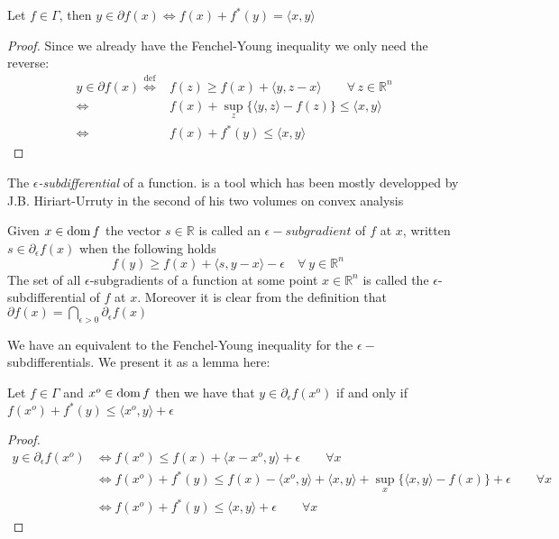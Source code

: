\begin{lemma}\label{fenchelDualLemma}
	Let $f\in \Gamma$, then $y\in \partial f(x) \iff 
	f(x) + f^*(y) = \langle x,y \rangle $
\end{lemma}
\begin{proof}
Since we already have the Fenchel-Young inequality we only need the reverse:
\begin{align*}
	y \in \partial f(x) \overset{\mathrm{def}}{\iff}&
	f(z)\geq f(x) +\langle y,z-x\rangle 
	\qquad \forall \, z\in\mathbb R^n\\
	\iff& f(x) + \sup_z\{\langle
	y,z\rangle -f(z)\}
	\leq \langle x,y \rangle \\
	\iff& f(x)+ f^*(y) \leq \langle x,y\rangle
\end{align*}
\end{proof}
\newpage
The  \emph{$\epsilon$-subdifferential} of a function.  is a tool which has been
mostly developped by J.B. Hiriart-Urruty in the second of his two volumes on
convex analysis \autocite[92]{hiriart1993convex} 
\begin{definition} 
	Given $x\in\mathrm{dom} \, f$ the vector $s\in \mathbb R$ is called
	an $\epsilon-subgradient$ of $f$ at $x$, written $s\in
	\partial_\epsilon f(x)$ when the following holds
	\begin{equation*}
		f(y) \geq f(x) + \langle s,y-x\rangle -\epsilon 
		\quad \forall \ y \in \mathbb R^n \quad
	\end{equation*}
The set of all $\epsilon$-subgradients of a function at some point
$x\in\mathbb R^n$ is called the $\epsilon$-subdifferential of $f$ at $x$.
Moreover it is clear from the definition that
$\partial f(x) = \bigcap_{\epsilon>0}\partial_{\epsilon}f(x)$
\end{definition}

We have an equivalent to the Fenchel-Young inequality for the $\epsilon-$
subdifferentials. We present it as a lemma here:
\begin{lemma}
	Let $f\in\Gamma$ and $x^o \in\mathrm{dom} \, f$ then we have that
	$y \in\partial_\epsilon f(x^o)$ if and only if 
	$f(x^o)+f^*(y) \leq \langle x^o,y\rangle + \epsilon$ 
	\label{FYepsilon}
\end{lemma}
\begin{proof}
	\begin{align*}
		y\in\partial_\epsilon f(x^o) &\iff 
		f(x^o) \leq f(x) + \langle x-x^o,y\rangle + \epsilon
		\qquad \forall x\\
	       &\iff	f(x^o) + f^*(y) \leq f(x) -\langle x^o,y\rangle 
		+ \langle x,y\rangle + \sup_x\{\langle x,y\rangle - f(x)\}
		+\epsilon \qquad\forall x\\
		&\iff f(x^o)+f^*(y) \leq \langle x,y\rangle + \epsilon 
		\qquad \forall x
	\end{align*}

\end{proof}
